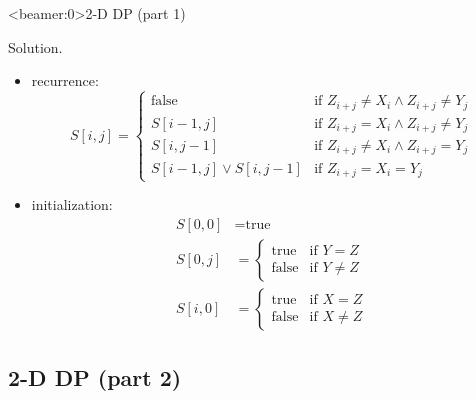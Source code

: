 \begin{frame}<beamer:0>{2-D DP (part 1)}
  \begin{block}{Solution.}
    \begin{itemize}
      \item recurrence:
	\begin{displaymath}
	  S[i,j] = \left\{ \begin{array}{ll}
	    \text{false} & \textrm{if $Z_{i+j} \neq X_{i} \land Z_{i+j} \neq Y_{j}$}\\
	    S[i-1,j] & \textrm{if $Z_{i+j} = X_{i} \land Z_{i+j} \neq Y_{j}$}\\
	    S[i,j-1] & \textrm{if $Z_{i+j} \neq X_{i} \land Z_{i+j} = Y_{j}$}\\
	    S[i-1,j] \lor S[i,j-1] & \textrm{if $Z_{i+j} = X_{i} = Y_{j}$}
	  \end{array} \right.
	\end{displaymath}
      \item initialization: 
	\begin{align*}
	  S[0,0] &= \text{true} \\
	  S[0,j] &= \left\{ \begin{array}{ll}
	    \text{true} & \text{if } Y = Z  \\
	    \text{false} & \text{if } Y \neq Z
	  \end{array} \right. \\
	  S[i,0] &= \left\{ \begin{array}{ll}
	    \text{true} & \text{if } X = Z  \\
	    \text{false} & \text{if } X \neq Z
	  \end{array} \right.
	\end{align*}
    \end{itemize}
  \end{block}
\end{frame}
\subsection{2-D DP (part 2)}

